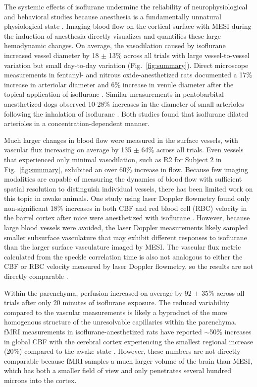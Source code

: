 \documentclass[12pt]{spieman}
\begin{document}
\begin{spacing}{2}
The systemic effects of isoflurane undermine the reliability of neurophysiological and behavioral studies because anesthesia is a fundamentally unnatural physiological state \cite{Gao:2017tw}. Imaging blood flow on the cortical surface with MESI during the induction of anesthesia directly visualizes and quantifies these large hemodynamic changes. On average, the vasodilation caused by isoflurane increased vessel diameter by 18 $\pm$ 13\% across all trials with large vessel-to-vessel variation but small day-to-day variation (Fig.~\ref{fig:summary}). Direct microscope measurements in fentanyl- and nitrous oxide-anesthetized rats documented a 17\% increase in arteriolar diameter and 6\% increase in venule diameter after the topical application of isoflurane \cite{Koenig:1994rn}. Similar measurements in pentobarbital-anesthetized dogs observed 10-28\% increases in the diameter of small arterioles following the inhalation of isoflurane \cite{Iida:1998th}. Both studies found that isoflurane dilated arterioles in a concentration-dependent manner.

Much larger changes in blood flow were measured in the surface vessels, with vascular flux increasing on average by 135 $\pm$ 64\% across all trials. Even vessels that experienced only minimal vasodilation, such as R2 for Subject 2 in Fig.~\ref{fig:summary}, exhibited an over 60\% increase in flow. Because few imaging modalities are capable of measuring the dynamics of blood flow with sufficient spatial resolution to distinguish individual vessels, there has been limited work on this topic in awake animals. One study using laser Doppler flowmetry found only non-significant 18\% increases in both CBF and red blood cell (RBC) velocity in the barrel cortex after mice were anesthetized with isoflurane \cite{Takuwa:2012ee}. However, because large blood vessels were avoided, the laser Doppler measurements likely sampled smaller subsurface vasculature that may exhibit different responses to isoflurane than the larger surface vasculature imaged by MESI. The vascular flux metric calculated from the speckle correlation time is also not analogous to either the CBF or RBC velocity measured by laser Doppler flowmetry, so the results are not directly comparable \cite{Kazmi:2015du}.

Within the parenchyma, perfusion increased on average by 92 $\pm$ 35\% across all trials after only 20 minutes of isoflurane exposure. The reduced variability compared to the vascular measurements is likely a byproduct of the more homogenous structure of the unresolvable capillaries within the parenchyma. fMRI measurements in isoflurane-anesthetized rats have reported $\sim$50\% increases in global CBF with the cerebral cortex experiencing the smallest regional increase (20\%) compared to the awake state \cite{Sicard:2003dj}. However, these numbers are not directly comparable because fMRI samples a much larger volume of the brain than MESI, which has both a smaller field of view and only penetrates several hundred microns into the cortex.


\end{spacing}
\end{document}
